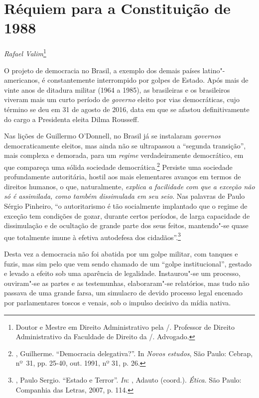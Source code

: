 \chapter*{Réquiem para a Constituição de 1988}


\begin{flushright}
\emph{Rafael Valim}\footnote{Doutor e Mestre em Direito Administrativo
pela /. Professor de Direito Administrativo da Faculdade de Direito
da /. Advogado.}
\end{flushright}

O projeto de democracia no Brasil, a exemplo dos demais países
latino"-americanos, é constantemente interrompido por golpes de Estado.
Após mais de vinte anos de ditadura militar (1964 a 1985), as
brasileiras e os brasileiros viveram mais um curto período de
\emph{governo} eleito por vias democráticas, cujo término se deu em 31
de agosto de 2016, data em que se afastou definitivamente do cargo a
Presidenta eleita Dilma Rousseff.

Nas lições de Guillermo O'Donnell, no Brasil já se instalaram
\emph{governos} democraticamente eleitos, mas ainda não se ultrapassou a
``segunda transição'', mais complexa e demorada, para um \emph{regime}
verdadeiramente democrático, em que compareça uma sólida sociedade
democrática.\footnote{, Guilherme. ``Democracia delegativa?''.
In \emph{Novos estudos},
  São Paulo: Cebrap, nº~31, pp. 25-40, out. 1991, nº 31, p. 26.}
Persiste uma sociedade profundamente autoritária, hostil aos mais
elementares avanços em termos de direitos humanos, o que, naturalmente,
\emph{explica a facilidade com que a exceção não só é assimilada, como
também dissimulada em seu seio}. Nas palavras de Paulo Sérgio Pinheiro,
``o autoritarismo é tão socialmente implantado que o regime de exceção
tem condições de gozar, durante certos períodos, de larga capacidade de
dissimulação e de ocultação de grande parte dos seus feitos, mantendo"-se
quase que totalmente imune à efetiva autodefesa dos
cidadãos''.\footnote{, Paulo Sergio. ``Estado e Terror''.
  \emph{In}: , Adauto (coord.). \emph{Ética}. São Paulo: Companhia
  das Letras, 2007, p. 114.}

Desta vez a democracia não foi abatida por um golpe militar, com tanques
e fuzis, mas sim pelo que vem sendo chamado de um ``golpe
institucional'', gestado e levado a efeito sob uma aparência de
legalidade. Instaurou"-se um processo, ouviram"-se as partes e as
testemunhas, elaboraram"-se relatórios, mas tudo não passava de uma
grande farsa, um simulacro de devido processo legal encenado por
parlamentares toscos e venais, sob o impulso decisivo da mídia nativa.

